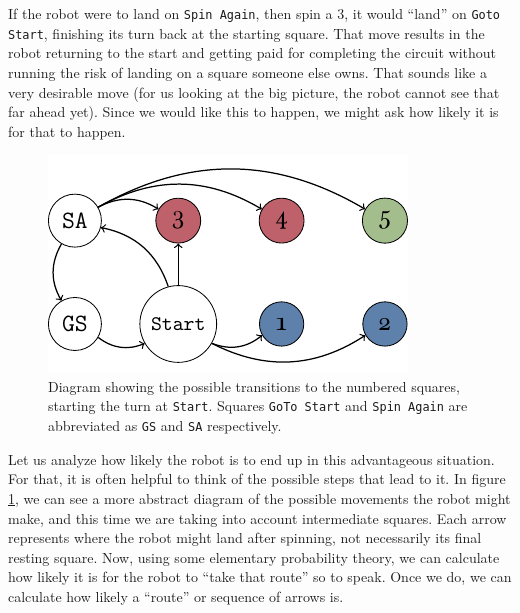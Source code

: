 If the robot were to land on \texttt{Spin Again}, then spin a 3, it would
``land'' on \texttt{Goto Start}, finishing its turn back at the starting square.
That move results in the robot returning to the start and getting paid for
completing the circuit without running the risk of landing on a square someone
else owns. That sounds like a very desirable move (for us looking at the big
picture, the robot cannot see that far ahead yet). Since we would like this to
happen, we might ask how likely it is for that to happen.

\begin{figure}
\centering
\includegraphics[width=\textwidth]{img/transicion.pdf}
\caption{Diagram showing the possible transitions to the 
numbered squares, starting the turn at \texttt{Start}. Squares 
\texttt{GoTo Start} and \texttt{Spin Again} are abbreviated as 
\texttt{GS} and \texttt{SA} respectively.}
\label{fig:markov-start}
\end{figure}

Let us analyze how likely the robot is to end up in this advantageous situation.
For that, it is often helpful to think of the possible steps that lead to it. In
figure \ref{fig:markov-start}, we can see a more abstract diagram of the
possible movements the robot might make, and this time we are taking into
account intermediate squares. Each arrow represents where the robot might land
after spinning, not necessarily its final resting square. Now, using some
elementary probability theory, we can calculate how likely it is for the robot
to ``take that route'' so to speak. Once we do, we can calculate how likely a
``route'' or sequence of arrows is.

